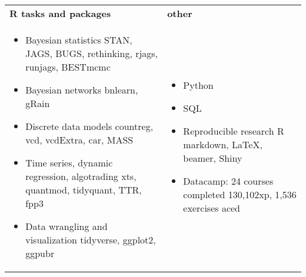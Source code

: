 \documentclass[10pt, a4paper]{article}
\begin{document}
\hspace{-3mm}
\begin{tabular}{p{8cm}p{6cm}}
	\textbf{\textsf{R} tasks and packages} & \textbf{other} \\

\vspace{-6mm}
\begin{itemize}[leftmargin=*]   \setlength{\itemsep}{0pt} \scriptsize
	\item \normalsize Bayesian statistics	 \newline  \scriptsize \textsf{STAN, JAGS, BUGS, rethinking, rjags, runjags, BESTmcmc}
	
	\item \normalsize  Bayesian networks  \newline  \scriptsize \textsf{bnlearn, gRain}

	\item \normalsize  Discrete data models  \newline  \scriptsize
	 \textsf{ countreg,  vcd, vcdExtra, car, MASS}

	\item \normalsize  Time series, dynamic regression, algotrading  \newline  \scriptsize
	\textsf{xts, quantmod, tidyquant, TTR, fpp3}
	
	\item \normalsize  Data wrangling and visualization  \newline  \scriptsize \textsf{tidyverse, ggplot2, ggpubr}

	
	

\end{itemize}
&
\vspace{-6mm}
\begin{itemize}[leftmargin=*]   \setlength{\itemsep}{0pt}\scriptsize
	\item \normalsize Python \scriptsize
	\item \normalsize SQL \scriptsize 
	\item \normalsize Reproducible research \newline \scriptsize 
	R markdown, LaTeX, beamer,  Shiny
	\item \normalsize \textsf{Datacamp}: 24 courses completed \newline \scriptsize   130,102xp, 1,536 exercises aced 
\end{itemize}
\end{tabular}	




\vspace{-4mm}
\end{document}
